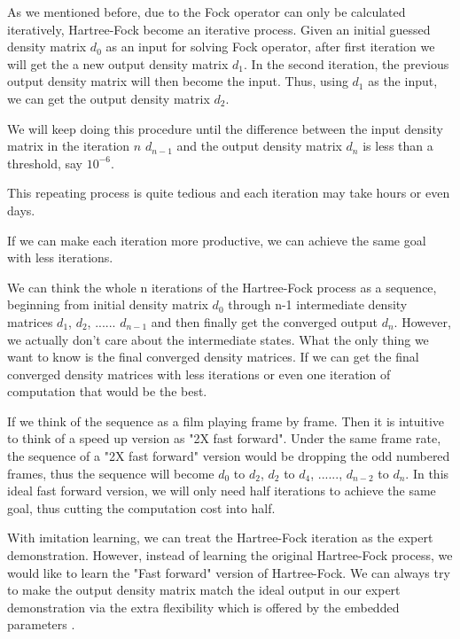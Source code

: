\documentclass[twoside]{article}
\begin{document}

As we mentioned before,  due to the Fock operator can only be calculated iteratively, Hartree-Fock become an iterative process. Given an initial guessed density matrix $d_0$ as an input for solving Fock operator, after first iteration we will get the a new output density matrix $d_1$. 
In the second iteration, the previous output density matrix will then become the input. Thus, using $d_1$ as the input, we can get the output density matrix $d_2$. 

We will keep doing this procedure until the difference between the input density matrix in the iteration $n$ $d_{n-1}$  and the output density matrix $d_n$ is less than a threshold, say $10^{-6}$. 

This repeating process is quite tedious and each iteration may take hours or even days. %

If we can make each iteration more productive, we can achieve the same goal with less iterations. 

We can think the whole n iterations of the Hartree-Fock process as a sequence, beginning from initial density matrix $d_0$ through n-1 intermediate density matrices $d_1$,  $d_2$,  ...... $d_{n-1}$ and then finally get the converged output $d_{n}$. However, we actually don't care about the intermediate states. What the only thing we want to know is the final converged density matrices. If we can get the final converged density matrices with less iterations or even one iteration of computation that would be the best. 


If we think of the sequence as a film playing frame by frame. Then it is intuitive to think of a speed up version as "2X fast forward". 
Under the same frame rate, the sequence of a  "2X fast forward" version would be dropping the odd numbered frames, thus the sequence will become $d_0$ to $d_2$, $d_2$ to $d_4$, ......, $d_{n-2}$ to $d_n$. In this ideal fast forward version, we will only need half iterations to achieve the same goal, thus cutting the computation cost into half.


With imitation learning,
we can treat the Hartree-Fock iteration as the expert demonstration. However, instead of learning the original Hartree-Fock process, we would like to learn the "Fast forward" version of Hartree-Fock. We can always try to make the output density matrix match the ideal output in our expert demonstration via the extra flexibility which is offered by the embedded parameters .
\end{document}
